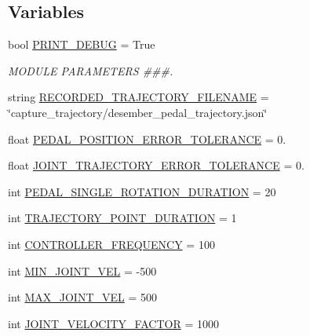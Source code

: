 \subsection*{Variables}
\begin{DoxyCompactItemize}
\item 
bool \mbox{\hyperlink{namespacepedal__simulation_ac01ec3a6a2b3bfa546ca8317b4064fd7}{P\+R\+I\+N\+T\+\_\+\+D\+E\+B\+UG}} = True
\begin{DoxyCompactList}\small\item\em M\+O\+D\+U\+LE P\+A\+R\+A\+M\+E\+T\+E\+RS \#\#\#. \end{DoxyCompactList}\item 
string \mbox{\hyperlink{namespacepedal__simulation_a8090f9acb65db197227394489b01e764}{R\+E\+C\+O\+R\+D\+E\+D\+\_\+\+T\+R\+A\+J\+E\+C\+T\+O\+R\+Y\+\_\+\+F\+I\+L\+E\+N\+A\+ME}} = \char`\"{}capture\+\_\+trajectory/desember\+\_\+pedal\+\_\+trajectory.\+json\char`\"{}
\item 
float \mbox{\hyperlink{namespacepedal__simulation_aec7366c58850a21df44793bed8baf7a7}{P\+E\+D\+A\+L\+\_\+\+P\+O\+S\+I\+T\+I\+O\+N\+\_\+\+E\+R\+R\+O\+R\+\_\+\+T\+O\+L\+E\+R\+A\+N\+CE}} = 0.
\item 
float \mbox{\hyperlink{namespacepedal__simulation_a4cd59087b814eb188e34704ca32b3551}{J\+O\+I\+N\+T\+\_\+\+T\+R\+A\+J\+E\+C\+T\+O\+R\+Y\+\_\+\+E\+R\+R\+O\+R\+\_\+\+T\+O\+L\+E\+R\+A\+N\+CE}} = 0.
\item 
int \mbox{\hyperlink{namespacepedal__simulation_a022ae99e41a08e94aedea21ff43734cc}{P\+E\+D\+A\+L\+\_\+\+S\+I\+N\+G\+L\+E\+\_\+\+R\+O\+T\+A\+T\+I\+O\+N\+\_\+\+D\+U\+R\+A\+T\+I\+ON}} = 20
\item 
int \mbox{\hyperlink{namespacepedal__simulation_ad6251b69f5c7d2a8f1a3d765bb1ce37b}{T\+R\+A\+J\+E\+C\+T\+O\+R\+Y\+\_\+\+P\+O\+I\+N\+T\+\_\+\+D\+U\+R\+A\+T\+I\+ON}} = 1
\item 
int \mbox{\hyperlink{namespacepedal__simulation_a3a4de9c574500f2527349752b61fd818}{C\+O\+N\+T\+R\+O\+L\+L\+E\+R\+\_\+\+F\+R\+E\+Q\+U\+E\+N\+CY}} = 100
\item 
int \mbox{\hyperlink{namespacepedal__simulation_a5624f376e95c012680219818f9b76cd5}{M\+I\+N\+\_\+\+J\+O\+I\+N\+T\+\_\+\+V\+EL}} = -\/500
\item 
int \mbox{\hyperlink{namespacepedal__simulation_a6dc3554f4d28fc17e85b0186c18e1aed}{M\+A\+X\+\_\+\+J\+O\+I\+N\+T\+\_\+\+V\+EL}} = 500
\item 
int \mbox{\hyperlink{namespacepedal__simulation_af59bc3c310f46fbe45dc3772c0ad1a9c}{J\+O\+I\+N\+T\+\_\+\+V\+E\+L\+O\+C\+I\+T\+Y\+\_\+\+F\+A\+C\+T\+OR}} = 1000

\end{DoxyCompactItemize}
